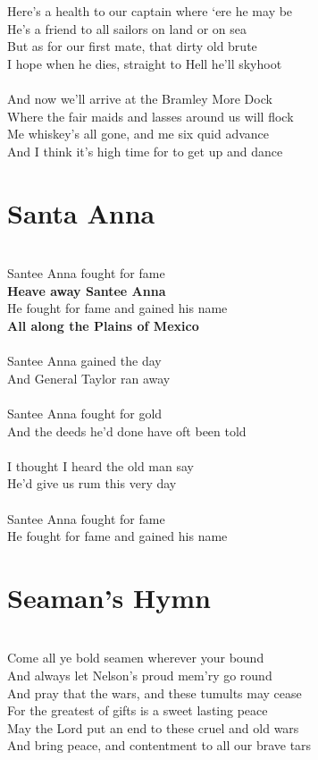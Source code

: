 \documentclass[letterpaper,9pt]{article}
\begin{document}
\\
\\Here’s a health to our captain where ‘ere he may be
\\He’s a friend to all sailors on land or on sea
\\But as for our first mate, that dirty old brute
\\I hope when he dies, straight to Hell he’ll skyhoot
\\
\\And now we’ll arrive at the Bramley More Dock
\\Where the fair maids and lasses around us will flock
\\Me whiskey’s all gone, and me six quid advance
\\And I think it’s high time for to get up and dance

\newpage
\section{Santa Anna}
\LARGE
\noindent
\\Santee Anna fought for fame
\\\textbf{Heave away Santee Anna}
\\He fought for fame and gained his name
\\\textbf{All along the Plains of Mexico}
\\
\\Santee Anna gained the day
\\And General Taylor ran away
\\
\\Santee Anna fought for gold
\\And the deeds he'd done have oft been told
\\
\\I thought I heard the old man say
\\He'd give us rum this very day
\\
\\Santee Anna fought for fame
\\He fought for fame and gained his name

\section{Seaman's Hymn}
\noindent
\\Come all ye bold seamen wherever your bound
\\And always let Nelson's proud mem'ry go round
\\And pray that the wars, and these tumults may cease
\\For the greatest of gifts is a sweet lasting peace
\\May the Lord put an end to these cruel and old wars
\\And bring peace, and contentment to all our brave tars
\end{document}
